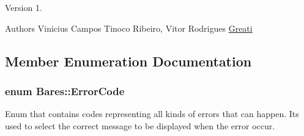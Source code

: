 \begin{DoxyVersion}{Version}
1. 
\end{DoxyVersion}
\begin{DoxyAuthor}{Authors}
Vinicius Campos Tinoco Ribeiro, Vitor Rodrigues \hyperlink{namespaceGreati}{Greati} 
\end{DoxyAuthor}


\subsection{Member Enumeration Documentation}
\subsubsection[{Error\+Code}]{\setlength{\rightskip}{0pt plus 5cm}enum {\bf Bares\+::\+Error\+Code}\hspace{0.3cm}{\ttfamily [strong]}}\hypertarget{classBares_ad484a97e0efc1721d2b95209a1700e44}{}\label{classBares_ad484a97e0efc1721d2b95209a1700e44}


Enum that contains codes representing all kinds of errors that can happen. It\textquotesingle{}s used to select the correct message to be displayed when the error occur. 

